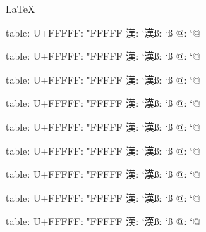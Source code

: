 \documentclass{article}
\makeatletter
\def\testcattable#1{\par\noindent{\bf \string#1}\par{%
table: \the#1\quad\luatexcatcodetable#1
U+FFFFF: \the\catcode"FFFFF\quad%
漢: \the\catcode`漢\quad ß: \the\catcode`ß\quad
@: \the\catcode`@
}}
\makeatother
\begin{document}
\LaTeX


\testcattable{\zero}
\testcattable{\CatcodeTableIniTeX}
\testcattable{\CatcodeTableString}
\testcattable{\CatcodeTableOther}
\testcattable{\CatcodeTableLaTeX}
\testcattable{\CatcodeTableLaTeXAtLetter}
\testcattable{\CatcodeTableExpl}
\testcattable{\CatcodeTablehoge}
\testcattable{\CatcodeTablepiyo}
\end{document}
